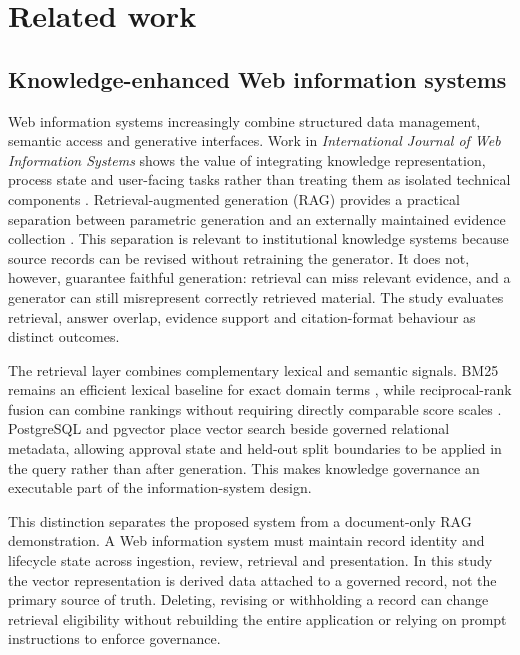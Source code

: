 \section{Related work}

\subsection{Knowledge-enhanced Web information systems}

Web information systems increasingly combine structured data management, semantic access and generative interfaces. Work in \emph{International Journal of Web Information Systems} shows the value of integrating knowledge representation, process state and user-facing tasks rather than treating them as isolated technical components \citep{hubscher2021knowledge}. Retrieval-augmented generation (RAG) provides a practical separation between parametric generation and an externally maintained evidence collection \citep{lewis2020rag}. This separation is relevant to institutional knowledge systems because source records can be revised without retraining the generator. It does not, however, guarantee faithful generation: retrieval can miss relevant evidence, and a generator can still misrepresent correctly retrieved material. The study evaluates retrieval, answer overlap, evidence support and citation-format behaviour as distinct outcomes.

The retrieval layer combines complementary lexical and semantic signals. BM25 remains an efficient lexical baseline for exact domain terms \citep{robertson2009bm25}, while reciprocal-rank fusion can combine rankings without requiring directly comparable score scales \citep{cormack2009rrf}. PostgreSQL and pgvector place vector search beside governed relational metadata, allowing approval state and held-out split boundaries to be applied in the query rather than after generation. This makes knowledge governance an executable part of the information-system design.

This distinction separates the proposed system from a document-only RAG demonstration. A Web information system must maintain record identity and lifecycle state across ingestion, review, retrieval and presentation. In this study the vector representation is derived data attached to a governed record, not the primary source of truth. Deleting, revising or withholding a record can change retrieval eligibility without rebuilding the entire application or relying on prompt instructions to enforce governance.

